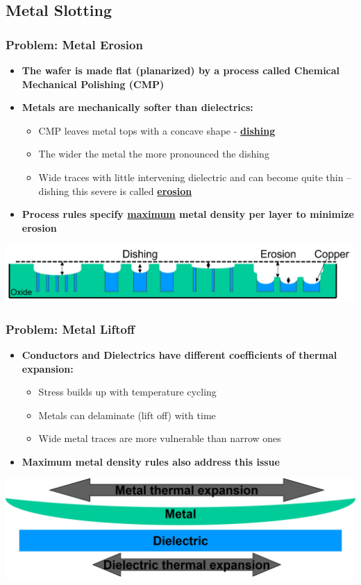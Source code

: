 \documentclass[compress]{beamer}
\begin{document}
\subsection[Slotting]{Metal Slotting}
\begin{frame}
	\frametitle{Problem: Metal Erosion}
	\begin{itemize}
		\item \textbf{The wafer is made flat (planarized) by a process
		called Chemical Mechanical Polishing (CMP)}
	\item \textbf{Metals are mechanically softer than dielectrics:}
	\begin{itemize}
		\item CMP leaves metal tops with a concave shape - \textbf{\underline{dishing}}
		\item The wider the metal the more pronounced the dishing
		\item Wide traces with little intervening dielectric and can
		become quite thin – dishing this severe is called \textbf{\underline{erosion}}
	\end{itemize}
	\item \textbf{Process rules specify \underline{maximum} metal density per
	layer to minimize erosion}
	\end{itemize}
\begin{center}
	\includegraphics[width=\textwidth]{Erosion}
\end{center}
\end{frame}

\begin{frame}
	\frametitle{Problem: Metal Liftoff}
	\begin{itemize}
		\item \textbf{Conductors and Dielectrics have different coefficients
		of thermal expansion:}
	\begin{itemize}
		\item Stress builds up with temperature cycling
		\item Metals can delaminate (lift off) with time
		\item Wide metal traces are more vulnerable than narrow ones
	\end{itemize}
		\item \textbf{Maximum metal density rules also address this issue}
	\end{itemize}
\begin{center}
	\includegraphics[width=\textwidth]{Liftoff}
\end{center}
\end{frame}
\end{document}
